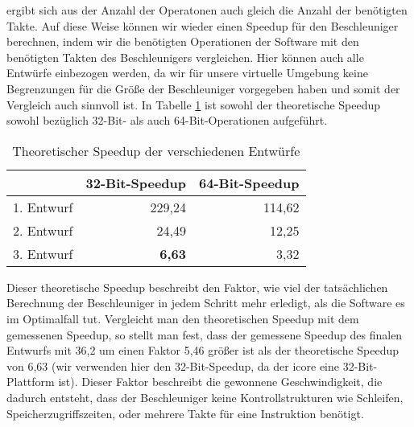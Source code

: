ergibt sich aus der Anzahl der Operatonen auch gleich die Anzahl der benötigten Takte.
Auf diese Weise können wir wieder einen Speedup für den Beschleuniger berechnen, indem wir die benötigten Operationen
der Software mit den benötigten Takten des Beschleunigers vergleichen. Hier können auch alle Entwürfe einbezogen werden,
da wir für unsere virtuelle Umgebung keine Begrenzungen für die Größe der Beschleuniger vorgegeben haben und somit der Vergleich auch sinnvoll ist.
In Tabelle \ref{tab:theoretischer_speedup} ist sowohl der theoretische Speedup sowohl bezüglich 32-Bit- als auch 64-Bit-Operationen aufgeführt.
\begin{table}
    \centering
    \begin{tabular}{lrr}
        & 32-Bit-Speedup & 64-Bit-Speedup \\
        \hline
        1. Entwurf & 229,24 & 114,62 \\
        2. Entwurf & 24,49 & 12,25 \\
        3. Entwurf & \textbf{6,63} & 3,32
    \end{tabular}
    \label{tab:theoretischer_speedup}
    \caption{Theoretischer Speedup der verschiedenen Entwürfe}
\end{table}
Dieser theoretische Speedup beschreibt den Faktor, wie viel der tatsächlichen Berechnung der Beschleuniger in jedem Schritt mehr erledigt,
als die Software es im Optimalfall tut. Vergleicht man den theoretischen Speedup mit dem gemessenen Speedup, so stellt man fest,
dass der gemessene Speedup des finalen Entwurfs mit 36,2 um einen Faktor 5,46 größer ist als der theoretische Speedup von 6,63
(wir verwenden hier den 32-Bit-Speedup, da der icore eine 32-Bit-Plattform ist). Dieser Faktor beschreibt die gewonnene Geschwindigkeit,
die dadurch entsteht, dass der Beschleuniger keine Kontrollstrukturen wie Schleifen, Speicherzugriffszeiten, oder mehrere Takte für eine Instruktion benötigt.
